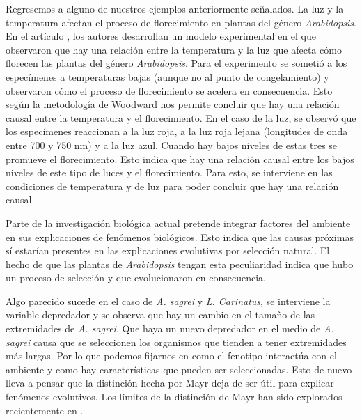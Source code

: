 Regresemos a alguno de nuestros ejemplos anteriormente señalados. La luz y la temperatura afectan el proceso de florecimiento en
plantas del género \emph{Arabidopsis}. En el artículo \cite{AusinEnviro}, los autores desarrollan un modelo experimental en el que
observaron que hay una relación entre la temperatura y la luz que afecta cómo florecen las plantas del género \emph{Arabidopsis}.
Para el experimento se sometió a los especímenes a temperaturas bajas (aunque no al punto de congelamiento) y observaron cómo el proceso de florecimiento se acelera en consecuencia. Esto según la metodología de Woodward nos permite concluir que hay una relación causal entre la temperatura y el florecimiento. En el caso de la luz, se observó que los especímenes reaccionan a la luz roja, a la luz roja lejana (longitudes de onda entre 700 y 750 nm) y a la luz azul. Cuando hay bajos niveles de estas tres se promueve el florecimiento. Esto indica que hay una relación causal entre los bajos niveles de este tipo de luces y el florecimiento. Para esto, se interviene en las condiciones de temperatura y de luz para poder concluir que hay una relación causal.

\begin{center}
\end{center}

Parte de la investigación biológica actual pretende integrar factores del ambiente en sus explicaciones de fenómenos
biológicos. Esto indica que las causas próximas sí estarían presentes en las explicaciones evolutivas por selección natural. El
hecho de que las plantas de \emph{Arabidopsis} tengan esta peculiaridad indica que hubo un proceso de selección y que evolucionaron en consecuencia.

Algo parecido sucede en el caso de \emph{A. sagrei} y \emph{L. Carinatus}, se interviene la variable depredador y se observa que hay un cambio en el tamaño de las extremidades de \emph{A. sagrei}. Que haya un nuevo depredador en el medio de \emph{A. sagrei} causa que se seleccionen los organismos que tienden a tener extremidades más largas. Por lo que podemos fijarnos en como el fenotipo interactúa con el ambiente y como hay características que pueden ser seleccionadas. Esto de nuevo lleva a pensar que la distinción hecha por Mayr deja de ser útil para explicar fenómenos evolutivos. Los límites de la distinción de Mayr han sido explorados recientemente en \cite{Uller2020, Dayan2020, Laland2011}.

